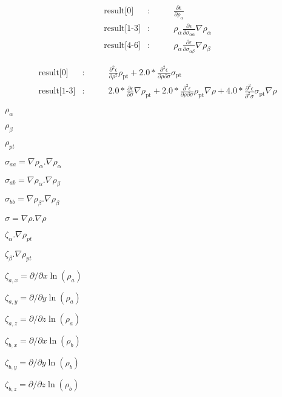 \documentclass{article}
\begin{document}
\begin{eqnarray*} \mbox{result[0]} &:& \qquad \frac{\partial \epsilon}{\partial \rho_{\alpha}} \\ \mbox{result[1-3]} &:& \qquad \rho_\alpha \frac{\partial \epsilon}{\partial \sigma_{\alpha \alpha}} \nabla\rho_\alpha\\ \mbox{result[4-6]} &:& \qquad \rho_\alpha \frac{\partial \epsilon}{\partial \sigma_{\alpha \beta}} \nabla\rho_\beta \end{eqnarray*}
\pagebreak

\begin{eqnarray*} \mbox{result[0]} &:& \qquad \frac{\partial^2 \epsilon}{\partial \rho^2} \rho_\mathrm{pt} + 2.0 * \frac{\partial^2 \epsilon}{\partial \rho\partial\sigma}\sigma_\mathrm{pt}\\ \mbox{result[1-3]} &:& \qquad 2.0 * \frac{\partial\epsilon}{\partial\sigma}\nabla\rho_\mathrm{pt} + 2.0 * \frac{\partial^2\epsilon}{\partial\rho\partial\sigma} \rho_\mathrm{pt}\nabla\rho + 4.0 * \frac{\partial^2\epsilon}{\partial^2\sigma} \sigma_\mathrm{pt}\nabla\rho \end{eqnarray*}
\pagebreak

$ \rho_\alpha $
\pagebreak

$ \rho_\beta $
\pagebreak

$ \rho_{pt} $
\pagebreak

$ \sigma_{aa} = \nabla \rho_{\alpha}.\nabla \rho_{\alpha} $
\pagebreak

$ \sigma_{ab} = \nabla \rho_{\alpha}.\nabla \rho_{\beta} $
\pagebreak

$ \sigma_{bb} = \nabla \rho_{\beta}.\nabla \rho_{\beta} $
\pagebreak

$ \sigma = \nabla \rho.\nabla \rho $
\pagebreak

$ \zeta_{\alpha}.\nabla\rho_{pt} $
\pagebreak

$ \zeta_{\beta}.\nabla\rho_{pt} $
\pagebreak

$ \zeta_{a,x}=\partial/{\partial x} \ln(\rho_a) $
\pagebreak

$ \zeta_{a,y}=\partial/{\partial y} \ln(\rho_a) $
\pagebreak

$ \zeta_{a,z}=\partial/{\partial z} \ln(\rho_a) $
\pagebreak

$ \zeta_{b,x} = \partial/{\partial x} \ln(\rho_b) $
\pagebreak

$ \zeta_{b,y} = \partial/{\partial y} \ln(\rho_b) $
\pagebreak

$ \zeta_{b,z} = \partial/{\partial z} \ln(\rho_b) $
\pagebreak
\end{document}
